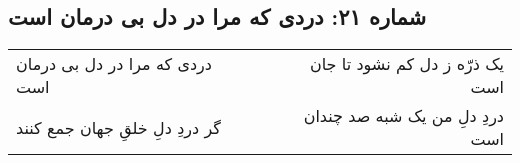\begin{center}
\section*{شماره ۲۱: دردی که مرا در دل بی درمان است}
\label{sec:021}
\begin{longtable}{l p{0.5cm} r}
دردی که مرا در دل بی درمان است
&&
یک ذرّه ز دل کم نشود تا جان است
\\
گر دردِ دلِ خلقِ جهان جمع کنند
&&
دردِ دلِ من یک شبه صد چندان است
\\
\end{longtable}
\end{center}
